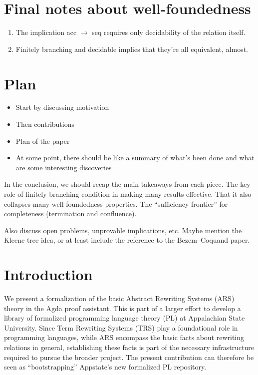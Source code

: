 \documentclass{scrartcl}
\begin{document}
\section{Final notes about well-foundedness}

\begin{enumerate}
  \item The implication acc $\to$ seq requires only decidability of the relation itself.
  \item Finitely branching and decidable implies that they're all equivalent, almost.

\end{enumerate}

\section{Plan}
\begin{itemize}
  \item Start by discussing motivation
  \item Then contributions
  \item Plan of the paper
  \item At some point, there should be like a summary of what's been done and what are some interesting discoveries
\end{itemize}



In the conclusion, we should recap the main takeaways from each piece.
The key role of finitely branching condition in making many results effective.
That it also collapses many well-foundedness properties.
The ``sufficiency frontier'' for completeness (termination and confluence).

Also discuss open problems, unprovable implications, etc.
Maybe mention the Kleene tree idea, or at least include the reference to the Bezem--Coquand paper.

\section{Introduction}
We present a formalization of the basic Abstract Rewriting Systems (ARS) theory in the Agda proof assistant.
This is part of a larger effort to develop a library of formalized programming language theory (PL)
at Appalachian State University.
Since Term Rewriting Systems (TRS) play a foundational role in programming languages,
while ARS encompass the basic facts about rewriting relations in general,
establishing these facts is part of the necessary infrastructure required to
pursue the broader project.  The present contribution can therefore be seen as
``bootstrapping'' Appstate's new formalized PL repository.
\end{document}
